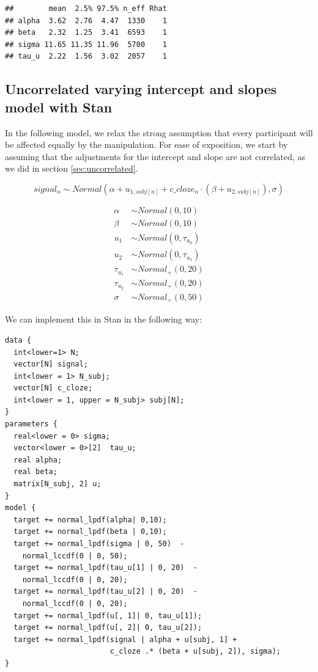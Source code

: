 \documentclass[12pt,]{krantz}
\theoremstyle{definition}
\theoremstyle{definition}
\theoremstyle{definition}
\theoremstyle{remark}
\begin{document}
\begin{verbatim}
##        mean  2.5% 97.5% n_eff Rhat
## alpha  3.62  2.76  4.47  1330    1
## beta   2.32  1.25  3.41  6593    1
## sigma 11.65 11.35 11.96  5700    1
## tau_u  2.22  1.56  3.02  2057    1
\end{verbatim}

\subsection{Uncorrelated varying intercept and slopes model with
Stan}\label{sec:uncorrstan}

In the following model, we relax the strong assumption that every
participant will be affected equally by the manipulation. For ease of
exposition, we start by assuming that the adjustments for the intercept
and slope are not correlated, as we did in section
\ref{sec:uncorrelated}.

\begin{equation}
  signal_n \sim Normal(\alpha + u_{1,subj[n]} + c\_cloze_n \cdot (\beta+ u_{2,subj[n]}),\sigma)
\end{equation}

\begin{equation}
 \begin{aligned}
 \alpha &\sim Normal(0,10)\\
 \beta  &\sim Normal(0,10)\\
 u_1 &\sim Normal(0,\tau_{u_0})\\
 u_2 &\sim Normal(0,\tau_{u_1})\\
 \tau_{u_1} &\sim Normal_+(0,20) \\
 \tau_{u_2} &\sim Normal_+(0,20) \\
 \sigma  &\sim Normal_+(0,50)
 \end{aligned}
 \end{equation}

We can implement this in Stan in the following way:

\begin{verbatim}
data {
  int<lower=1> N;
  vector[N] signal;
  int<lower = 1> N_subj;
  vector[N] c_cloze;
  int<lower = 1, upper = N_subj> subj[N]; 
}
parameters {
  real<lower = 0> sigma;
  vector<lower = 0>[2]  tau_u;   
  real alpha;
  real beta;
  matrix[N_subj, 2] u;
}
model {
  target += normal_lpdf(alpha| 0,10);
  target += normal_lpdf(beta | 0,10);
  target += normal_lpdf(sigma | 0, 50)  -
    normal_lccdf(0 | 0, 50);
  target += normal_lpdf(tau_u[1] | 0, 20)  - 
    normal_lccdf(0 | 0, 20);
  target += normal_lpdf(tau_u[2] | 0, 20)  - 
    normal_lccdf(0 | 0, 20);
  target += normal_lpdf(u[, 1]| 0, tau_u[1]);
  target += normal_lpdf(u[, 2]| 0, tau_u[2]);
  target += normal_lpdf(signal | alpha + u[subj, 1] +
                        c_cloze .* (beta + u[subj, 2]), sigma);
}
\end{verbatim}
\end{document}
